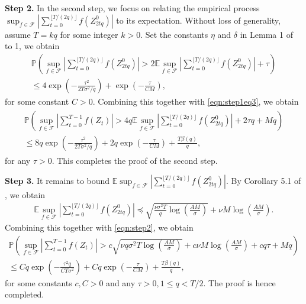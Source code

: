 \documentclass{article}
\newcommand{\Mean}{{\mathbb{E}}}
\newcommand{\prob}{{\mathbb{P}}}
\def\floor#1{\lfloor #1 \rfloor}
\begin{document}
\textbf{Step 2.} In the second step, we focus on relating the empirical process $\sup_{f\in \mathcal{F}} |\sum_{t=0}^{\floor{T/(2q)}} f(Z_{2tq}^0)|$ to its expectation. Without loss of generality, assume $T=kq$ for some integer $k>0$. Set the constants $\eta$ and $\delta$ in Lemma 1 of \cite{Adam2008} to 1, we obtain
\begin{eqnarray*}
	\prob\left(\sup_{f\in \mathcal{F}} \left|\sum_{t=0}^{\floor{T/(2q)}} f(Z_{2tq}^0)\right|>2\Mean \sup_{f\in \mathcal{F}} \left|\sum_{t=0}^{\floor{T/(2q)}} f(Z_{2tq}^0)\right| +\tau \right)\\
	\le 4\exp\left(-\frac{\tau^2}{2T\sigma^2/q}\right)+\exp\left(-\frac{\tau}{CM}\right),
\end{eqnarray*}
for some constant $C>0$. Combining this together with \eqref{eqn:step1eq3}, we obtain
\begin{eqnarray}\label{eqn:step2}
\begin{split}
	\prob\left(\sup_{f\in \mathcal{F}}\left|\sum_{t=0}^{T-1} f(Z_t)\right|>4q\Mean \sup_{f\in \mathcal{F}} \left|\sum_{t=0}^{\floor{T/(2q)}} f(Z_{2tq}^0)\right|+2\tau q+Mq\right)\\
\le 8q\exp\left(-\frac{\tau^2}{2T\sigma^2/q}\right)+2q\exp\left(-\frac{\tau}{CM}\right)+\frac{T\beta(q)}{q},
\end{split}
\end{eqnarray}
for any $\tau>0$. This completes the proof of the second step.

\textbf{Step 3.} It remains to bound $\Mean \sup_{f\in \mathcal{F}} |\sum_{t=0}^{\floor{T/(2q)}} f(Z_{2tq}^0)|$. By Corollary 5.1 of \cite{cherno2014}, we obtain
\begin{eqnarray*}
	\Mean \sup_{f\in \mathcal{F}} \left|\sum_{t=0}^{\floor{T/(2q)}} f(Z_{2tq}^0)\right|\preceq \sqrt{\frac{\nu \sigma^2T}{q} \log \left(\frac{AM}{\sigma}\right)}+\nu M \log \left(\frac{AM}{\sigma}\right).
\end{eqnarray*}
Combining this together with \eqref{eqn:step2}, we obtain 
\begin{eqnarray*}
	\prob\left(\sup_{f\in \mathcal{F}}\left|\sum_{t=0}^{T-1} f(Z_t)\right|>c\sqrt{\nu q\sigma^2T \log \left(\frac{AM}{\sigma}\right)}+c\nu M \log \left(\frac{AM}{\sigma}\right)+c q\tau+Mq\right)\\
	\le Cq\exp\left(-\frac{\tau^2q}{CT\sigma^2}\right)+Cq\exp\left(-\frac{\tau}{CM}\right)+\frac{T\beta(q)}{q},
\end{eqnarray*}
for some constants $c,C>0$ and any $\tau>0,1\le q<T/2$. The proof is hence completed. 



	
\end{document}
